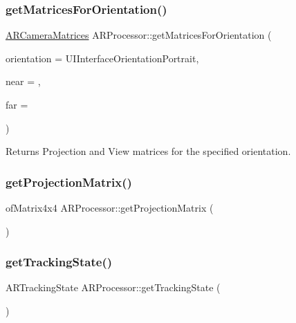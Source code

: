 \subsubsection{\texorpdfstring{get\+Matrices\+For\+Orientation()}{getMatricesForOrientation()}}
{\footnotesize\ttfamily \hyperlink{struct_a_r_common_1_1_a_r_camera_matrices}{A\+R\+Camera\+Matrices} A\+R\+Processor\+::get\+Matrices\+For\+Orientation (\begin{DoxyParamCaption}\item[{U\+I\+Interface\+Orientation}]{orientation = {\ttfamily UIInterfaceOrientationPortrait},  }\item[{float}]{near = {},  }\item[{float}]{far = {} }\end{DoxyParamCaption})}



Returns Projection and View matrices for the specified orientation. 

\mbox{\label{class_a_r_processor_a0f7cf764c73a8fc3964be088156766ea}} 
\subsubsection{\texorpdfstring{get\+Projection\+Matrix()}{getProjectionMatrix()}}
{\footnotesize\ttfamily of\+Matrix4x4 A\+R\+Processor\+::get\+Projection\+Matrix (\begin{DoxyParamCaption}{ }\end{DoxyParamCaption})\hspace{0.3cm}{\ttfamily [inline]}}

\mbox{\label{class_a_r_processor_aa53d195b42b23d9208071692fd5ac28d}} 
\subsubsection{\texorpdfstring{get\+Tracking\+State()}{getTrackingState()}}
{\footnotesize\ttfamily A\+R\+Tracking\+State A\+R\+Processor\+::get\+Tracking\+State (\begin{DoxyParamCaption}{ }\end{DoxyParamCaption})}

